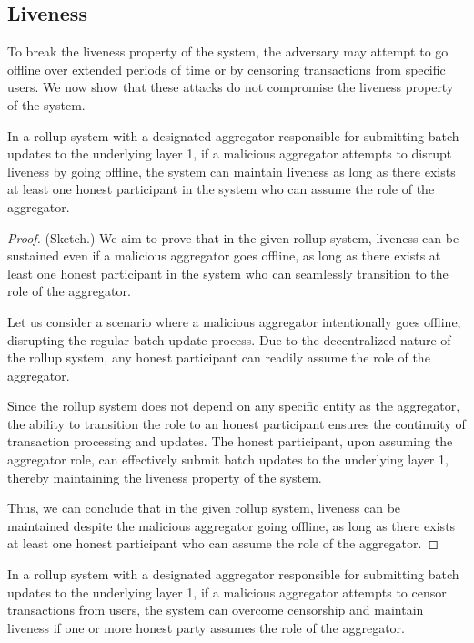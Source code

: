 \subsection{Liveness}

To break the liveness property of the system, the adversary may attempt to go offline over extended periods of time or by censoring transactions from specific users. We now show that these attacks do not compromise the liveness property of the system. 

\begin{theorem}
In a rollup system with a designated aggregator responsible for submitting batch updates to the underlying layer 1, if a malicious aggregator attempts to disrupt liveness by going offline, the system can maintain liveness as long as there exists at least one honest participant in the system who can assume the role of the aggregator.
\end{theorem}

\begin{proof}(Sketch.)
We aim to prove that in the given rollup system, liveness can be sustained even if a malicious aggregator goes offline, as long as there exists at least one honest participant in the system who can seamlessly transition to the role of the aggregator.

Let us consider a scenario where a malicious aggregator intentionally goes offline, disrupting the regular batch update process. Due to the decentralized nature of the rollup system, any honest participant can readily assume the role of the aggregator.

Since the rollup system does not depend on any specific entity as the aggregator, the ability to transition the role to an honest participant ensures the continuity of transaction processing and updates. The honest participant, upon assuming the aggregator role, can effectively submit batch updates to the underlying layer 1, thereby maintaining the liveness property of the system.

Thus, we can conclude that in the given rollup system, liveness can be maintained despite the malicious aggregator going offline, as long as there exists at least one honest participant who can assume the role of the aggregator.
\end{proof}

\begin{theorem}
In a rollup system with a designated aggregator responsible for submitting batch updates to the underlying layer 1, if a malicious aggregator attempts to censor transactions from users, the system can overcome censorship and maintain liveness if one or more honest party assumes the role of the aggregator.
\end{theorem}

